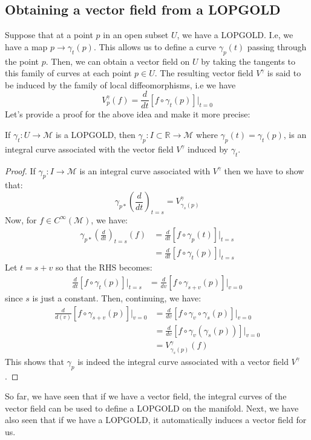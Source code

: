     \subsection{Obtaining a vector field from a LOPGOLD}
      Suppose that at a point $p$ in an open subset $U$, we have a LOPGOLD.
      I.e, we have a map $p \rightarrow \gamma_t(p)$. This allows us to
      define a curve $\gamma_p(t)$ passing through the point $p$. Then, we
      can obtain a vector field on $U$ by taking the tangents to this family
      of curves at each point $p \in U$. The resulting vector field
      $V^\gamma$ is said to be induced by the family of local
      diffeomorphisms, i.e we have
      \[V_p^\gamma(f) = \frac{d}{dt}\left[f \circ \gamma_t(p)\right]\bigr|_{t
      = 0} \]
      Let's provide a proof for the above idea and make it more precise:
      \begin{theorem}
        If $\gamma_t: U \rightarrow \mathcal{M}$ is a LOPGOLD, then
        $\gamma_p: I\subset \mathbb{R} \rightarrow \mathcal{M}$ where
        $\gamma_p(t) = \gamma_t(p)$, is an integral curve associated with the
        vector field $V^\gamma$ induced by $\gamma_t$.
      \end{theorem}
      \begin{proof}
        If $\gamma_p: I \rightarrow \mathcal{M}$ is an integral curve
        associated with $V^\gamma$ then we have to show that:
        \[\gamma_{p*}\left(\frac{d}{dt}\right)_{t=s} =
        V^\gamma_{\gamma_s(p)}\]
        Now, for $f \in C^\infty(\mathcal{M})$, we have:
        \begin{align*}
          \gamma_{p*}\left(\frac{d}{dt}\right)_{t=s}(f) 
          &= \frac{d}{dt}\left[f \circ \gamma_p(t)\right]\bigr|_{t=s} \\
          &= \frac{d}{dt}\left[f \circ \gamma_t(p)\right]\bigr|_{t=s}
        \end{align*}
        Let $t = s+v$ so that the RHS becomes:
        \begin{align*}
          \frac{d}{dt}\left[f \circ \gamma_t(p)\right]\bigr|_{t=s}
          &= \frac{d}{dv}\left[f \circ \gamma_{s+v}(p)\right]\bigr|_{v=0}
        \end{align*}
        since $s$ is just a constant. Then, continuing, we have:
        \begin{align*}
          \frac{d}{d(v)}\left[f \circ \gamma_{s+v}(p)\right]\bigr|_{v=0} 
          &= \frac{d}{dv}\left[f \circ
          \gamma_{v}\circ\gamma_s(p)\right]\bigr|_{v=0} \\
          &= \frac{d}{dv}\left[f \circ
          \gamma_{v}(\gamma_s(p))\right]\bigr|_{v=0} \\
          &= V^\gamma_{\gamma_s(p)}(f)
        \end{align*}
        This shows that $\gamma_p$ is indeed the integral curve associated
        with a vector field $V^\gamma$.
      \end{proof}
    So far, we have seen that if we have a vector field, the integral curves
    of the vector field can be used to define a LOPGOLD on the manifold.
    Next, we have also seen that if we have a LOPGOLD, it automatically
    induces a vector field for us. 

